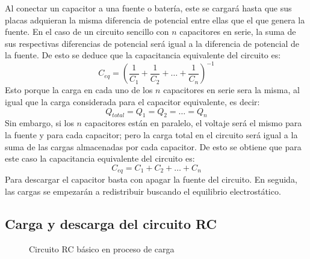 \documentclass[10pt,letter]{article}
\begin{document}
\begin{multicols}{2}
Al conectar un capacitor a una fuente o batería, este se cargará hasta que sus placas adquieran la misma diferencia de potencial entre ellas que el que genera la fuente. En el caso de un circuito sencillo con $n$ capacitores en serie, la suma de sus respectivas diferencias de potencial será igual a la diferencia de potencial de la fuente. De esto se deduce que la capacitancia equivalente del circuito es:
\begin{equation}
C_{eq}=\left(\dfrac{1}{C_1}+\dfrac{1}{C_2}+\dots+\dfrac{1}{C_n}\right)^{-1}
\end{equation}
Esto porque la carga en cada uno de los $n$ capacitores en serie sera la misma, al igual que la carga considerada para el capacitor equivalente, es decir:
\begin{equation}
Q_{total}=Q_1=Q_2=\dots=Q_n
\end{equation}
Sin embargo, si los $n$ capacitores están en paralelo, el voltaje será el mismo para la fuente y para cada capacitor; pero la carga total en el circuito será igual a la suma de las cargas almacenadas por cada capacitor. De esto se obtiene que para este caso la capacitancia equivalente del circuito es:
\begin{equation}
C_{eq}=C_1+C_2+\dots+C_n
\end{equation}
Para descargar el capacitor basta con apagar la fuente del circuito. En seguida, las cargas se empezarán a redistribuir buscando el equilibrio electrostático.

\subsection{Carga y descarga del circuito RC}

\begin{figure}[H]
\centering
{}
\caption{Circuito RC básico en proceso de carga}
\label{RCcarga}
\end{figure}


\end{multicols}
\end{document}
